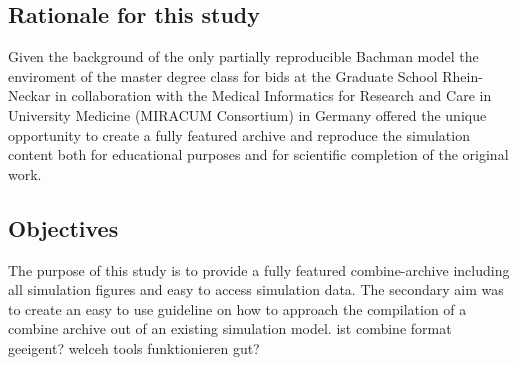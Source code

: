 \subsection*{Rationale for this study}
Given the background of the only partially reproducible Bachman model the enviroment of the master degree class for \ac{bids} at the Graduate School Rhein-Neckar  in  collaboration  with  the  Medical  Informatics  for  Research  and  Care  in  University Medicine (MIRACUM Consortium) in Germany offered the unique opportunity to create a fully featured archive and reproduce the simulation content both for educational purposes and for scientific completion of the original work. 

\subsection*{Objectives}
The purpose of this study is to provide a fully featured \acs{combine}-archive including all simulation figures and easy to access simulation data. The secondary aim was to create an easy to use guideline on how to approach the compilation of a \acs{combine} archive out of an existing simulation model. ist combine format geeigent? welceh tools funktionieren gut?

